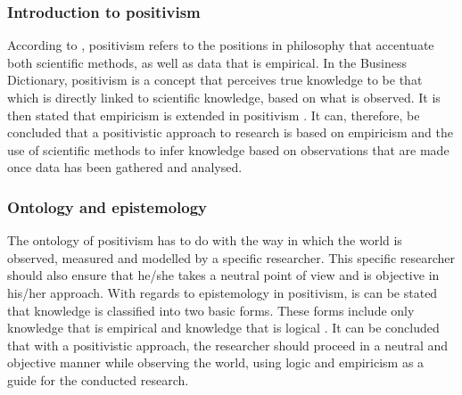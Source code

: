 \subsubsection{Introduction to positivism} 
According to \cite{Jakobsen2013}, positivism refers to the positions in philosophy that accentuate both scientific methods, as well as data that is empirical. In the Business Dictionary, positivism is a concept that perceives true knowledge to be that which is directly linked to scientific knowledge, based on what is observed. It is then stated that empiricism is extended in positivism \citep{schrag1992defense}. 
It can, therefore, be concluded that a positivistic approach to research is based on empiricism and the use of scientific methods to infer knowledge based on observations that are made once data has been gathered and analysed.
\subsubsection{Ontology and epistemology}
The ontology of positivism has to do with the way in which the world is observed, measured and modelled by a specific researcher. This specific researcher should also ensure that he/she takes a neutral point of view and is objective in his/her approach. 
With regards to epistemology in positivism, is can be stated that knowledge is classified into two basic forms. These forms include only knowledge that is empirical and knowledge that is logical \citep{OatesJ2006}.
It can be concluded that with a positivistic approach, the researcher should proceed in a neutral and objective manner while observing the world, using logic and empiricism as a guide for the conducted research.

